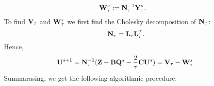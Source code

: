 \begin{discussion}
\begin{align}
    {\bf W}_\tau^s & := {\bf N}_\tau^{-1} {\bf Y}_\tau^s.
  \end{align}
  To find ${\bf V}_\tau$ and ${\bf W}_\tau^s$ we first find the Cholesky
  decomposition of ${\bf N}_\tau$:
  \begin{equation}
    {\bf N}_\tau = {\bf L}_\tau {\bf L}_\tau^T.
  \end{equation}
  Hence,
  \begin{equation}
    {\bf U}^{s + 1}
    = {\bf N}_\tau^{-1}
      ({\bf Z} - {\bf B} {\bf Q}^s - \frac{2}{\tau} {\bf C} {\bf U}^s)
    = {\bf V}_\tau - {\bf W}_\tau^s.
  \end{equation}
  Summarasing, we get the following algorithmic procedure.
\end{discussion}

